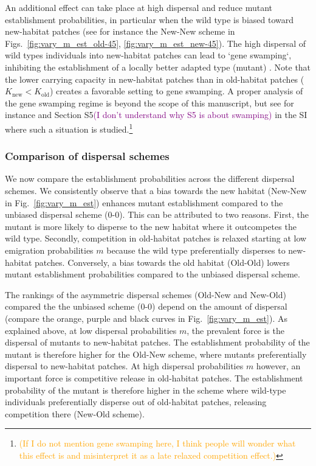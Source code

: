 \documentclass[11pt]{article}
\newcommand{\florence}[1]{\textcolor{purple}{(#1)}} %
\newcommand{\pete}[1]{\textcolor{orange}{(#1)}}
\begin{document}
An additional effect can take place at high dispersal and reduce mutant establishment probabilities, in particular when the wild type is biased toward new-habitat patches (see for instance the New-New scheme in Figs.~\ref{fig:vary_m_est_old-45}, \ref{fig:vary_m_est_new-45}). The high dispersal of wild types individuals into new-habitat patches can lead to `gene swamping`, inhibiting the establishment of a locally better adapted type (mutant) \citep{nagylaki_1978,lenormand_2002}. Note that the lower carrying capacity in new-habitat patches than in old-habitat patches ($K_{\text{new}}<K_{\text{old}}$) creates a favorable setting to gene swamping. 
A proper analysis of the gene swamping regime is beyond the scope of this manuscript, but see for instance \citet{tomasini_2018} {\color{gray}and Section S5\florence{I don't understand why S5 is about swamping} in the SI where such a situation is studied.\footnote{\pete{If I do not mention gene swamping here, I think people will wonder what this effect is and misinterpret it as a late relaxed competition effect.}}}

\subsubsection*{Comparison of dispersal schemes}

We now compare the establishment probabilities across the different dispersal schemes. 
We consistently observe that a bias towards the new habitat (New-New in Fig.~\ref{fig:vary_m_est}) enhances mutant establishment compared to the unbiased dispersal scheme (0-0). This can be attributed to two reasons. First, the mutant is more likely to disperse to the new habitat where it outcompetes the wild type. Secondly, competition in old-habitat patches is relaxed starting at low emigration probabilities $m$ because the wild type preferentially disperses to new-habitat patches. Conversely, a bias towards the old habitat (Old-Old) lowers mutant establishment probabilities compared to the unbiased dispersal scheme. 

The rankings of the asymmetric dispersal schemes (Old-New and New-Old) compared the the unbiased scheme (0-0) depend on the amount of dispersal (compare the orange, purple and black curves in Fig.~\ref{fig:vary_m_est}). As explained above, at low dispersal probabilities $m$, the prevalent force is the dispersal of mutants to new-habitat patches. The establishment probability of the mutant is therefore higher for the Old-New scheme, where mutants preferentially dispersal to new-habitat patches. At high dispersal probabilities $m$ however, an important force is competitive release in old-habitat patches. The establishment probability of the mutant is therefore higher in the scheme where wild-type individuals preferentially disperse out of old-habitat patches, releasing competition there (New-Old scheme).
\end{document}

